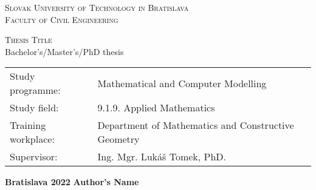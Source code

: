 \thispagestyle{empty}

\begin{center}
	\textsc{\LARGE
		Slovak University of Technology in Bratislava\\
		\vspace{10pt}
		Faculty of Civil Engineering}\\
	
	\vfill
	
	\textsc{\LARGE
		Thesis Title}\\ 
		\vspace{10pt}
	{\Large
		Bachelor's/Master's/PhD thesis}
\end{center}

\vfill

\noindent
\begin{tabular}{ll}
    Study programme: & Mathematical and Computer Modelling\\
	Study field: & 9.1.9. Applied Mathematics\\
	Training workplace:& Department of Mathematics and Constructive Geometry\\
	Supervisor: & Ing. Mgr. Lukáš Tomek, PhD. \\
\end{tabular}

\vspace{0.1\textheight}

{\Large
	\noindent \textbf{Bratislava 2022}
	\hfill \textbf{Author's Name}} %
\newpage

\


